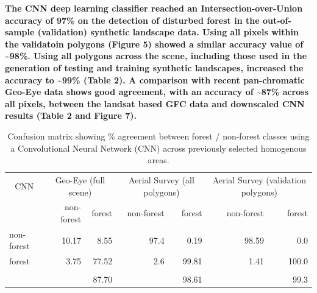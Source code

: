 \documentclass[remote sensing,article,submit,moreauthors,pdftex]{mdpi}
\begin{document}
\textbf{The CNN deep learning classifier reached an
Intersection-over-Union accuracy of 97\% on the detection of disturbed
forest in the out-of-sample (validation) synthetic landscape data. Using
all pixels within the validatoin polygons (Figure 5) showed a similar
accuracy value of \textasciitilde{}98\%. Using all polygons across the
scene, including those used in the generation of testing and training
synthetic landscapes, increased the accuracy to \textasciitilde{}99\%
(Table 2). A comparison with recent pan-chromatic Geo-Eye data shows
good agreement, with an accuracy of \textasciitilde{}87\% across all
pixels, between the landsat based GFC data and downscaled CNN results
(Table 2 and Figure 7).}

\begin{table}[!h]

\caption{\label{tab:unnamed-chunk-7}Confusion matrix showing \% agreement between forest / non-forest classes using a Convolutional Neural Network (CNN) across previously selected homogenous areas.}
\centering
\begin{tabular}[t]{lrrrrrr}
\toprule
\multicolumn{1}{c}{CNN} & \multicolumn{2}{c}{Geo-Eye (full scene)} & \multicolumn{2}{c}{Aerial Survey (all polygons)} & \multicolumn{2}{c}{Aerial Survey (validation polygons)} \\
\cmidrule(l{3pt}r{3pt}){1-1} \cmidrule(l{3pt}r{3pt}){2-3} \cmidrule(l{3pt}r{3pt}){4-5} \cmidrule(l{3pt}r{3pt}){6-7}
  & non-forest & forest & non-forest & forest & non-forest & forest\\
\midrule
non-forest & 10.17 & 8.55 & 97.4 & 0.19 & 98.59 & 0.0\\
forest & 3.75 & 77.52 & 2.6 & 99.81 & 1.41 & 100.0\\
\addlinespace[0.3em]
\multicolumn{7}{l}{\textbf{Accuracy}}\\
\hspace{1em} &  & 87.70 &  & 98.61 &  & 99.3\\
\bottomrule
\end{tabular}
\end{table}
\end{document}
